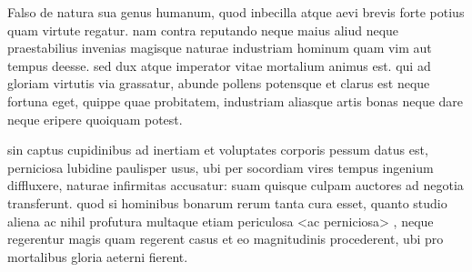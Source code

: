 \documentclass{article}
\begin{document}
\beginnumbering

\pstart Falso  de natura sua genus humanum, quod inbecilla atque aevi brevis forte potius quam virtute regatur. nam contra reputando neque maius aliud neque praestabilius invenias magisque naturae industriam hominum quam vim aut tempus deesse. sed dux atque imperator vitae mortalium animus est. qui  ad gloriam virtutis via grassatur, abunde pollens potensque et clarus est neque fortuna eget, quippe quae probitatem, industriam aliasque artis bonas neque dare neque eripere quoiquam potest. \pend

\pstart sin captus  cupidinibus ad inertiam et voluptates corporis pessum datus est, perniciosa lubidine paulisper usus, ubi per socordiam vires tempus ingenium diffluxere, naturae infirmitas accusatur: suam quisque culpam auctores ad negotia transferunt. quod si hominibus bonarum rerum tanta cura esset, quanto studio aliena ac nihil profutura multaque etiam periculosa <ac perniciosa> , neque regerentur magis quam regerent casus et eo magnitudinis procederent, ubi pro mortalibus gloria aeterni fierent.  \pend

\endnumbering
\end{document}
